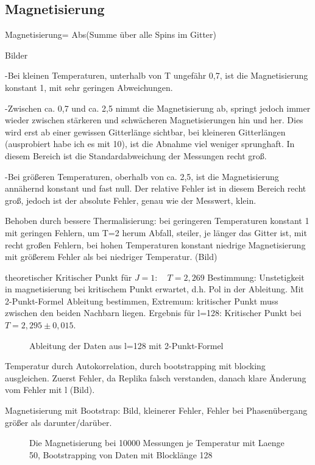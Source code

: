 \documentclass{scrreprt}
\begin{document}
	\subsection{Magnetisierung}
	Magnetisierung= Abs(Summe über alle Spins im Gitter)
	
	Bilder
	
	-Bei kleinen Temperaturen, unterhalb von T ungefähr 0,7, ist die
	 Magnetisierung konstant 1, mit sehr geringen Abweichungen.
	 
	 -Zwischen ca. 0,7 und ca. 2,5 nimmt die Magnetisierung ab, springt jedoch
	 immer wieder zwischen stärkeren und schwächeren Magnetisierungen hin und
	 her. Dies wird erst ab einer gewissen Gitterlänge sichtbar, bei kleineren
	 Gitterlängen (ausprobiert habe ich es mit 10), ist die Abnahme viel weniger
	 sprunghaft. In diesem Bereich ist die Standardabweichung der Messungen recht
	 groß.
	 
	 -Bei größeren Temperaturen, oberhalb von ca. 2,5, ist die Magnetisierung
	 annähernd konstant und fast null. Der relative Fehler ist in diesem Bereich
	 recht groß, jedoch ist der absolute Fehler, genau wie der Messwert, klein.
	 
	 Behoben durch bessere Thermalisierung: bei geringeren Temperaturen konstant 1 mit geringen Fehlern, 
	 um T=2 herum Abfall, steiler, je länger das Gitter ist, mit recht großen Fehlern, bei hohen Temperaturen konstant niedrige Magnetisierung mit größerem Fehler als bei niedriger Temperatur. (Bild)
	 
	 theoretischer Kritischer Punkt für $J=1:\quad T=2,269$
	 Bestimmung: Unstetigkeit in magnetisierung bei kritischem Punkt erwartet, d.h. Pol in der Ableitung. 
	 Mit 2-Punkt-Formel Ableitung bestimmen, Extremum: kritischer Punkt muss zwischen den beiden Nachbarn liegen. Ergebnis für l=128: Kritischer Punkt bei $T=2,295\pm0,015$.
	 	\begin{figure}
	 		
	 		\label{fig:ableitung}
	 		\caption{Ableitung der Daten aus l=128 mit 2-Punkt-Formel}
	 	\end{figure}
	 	
	 
	 Temperatur durch Autokorrelation, durch bootstrapping mit blocking ausgleichen. 
	 Zuerst Fehler, da Replika falsch verstanden, danach klare Änderung vom Fehler mit l (Bild).
	 
	 Magnetisierung mit Bootstrap: Bild, kleinerer Fehler, Fehler bei Phasenübergang größer als darunter/darüber.
	\begin{figure}
		
		\label{fig:magnetisierungbootstrap-l-128}
		\caption{Die Magnetisierung bei 10000 Messungen je Temperatur mit Laenge 50, Bootstrapping von Daten mit Blocklänge 128}
	\end{figure}
		
\end{document}
